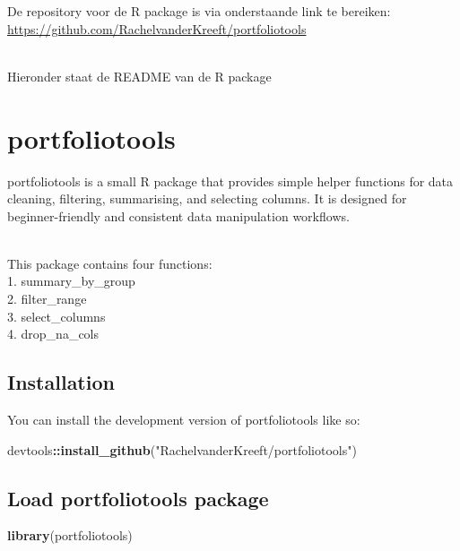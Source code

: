 \documentclass[
]{book}
\newenvironment{Shaded}{\begin{snugshade}}{\end{snugshade}}
\newcommand{\FunctionTok}[1]{\textcolor[rgb]{0.13,0.29,0.53}{\textbf{#1}}}
\newcommand{\NormalTok}[1]{#1}
\newcommand{\SpecialCharTok}[1]{\textcolor[rgb]{0.81,0.36,0.00}{\textbf{#1}}}
\newcommand{\StringTok}[1]{\textcolor[rgb]{0.31,0.60,0.02}{#1}}
\begin{document}
De repository voor de R package is via onderstaande link te bereiken:\\
\url{https://github.com/RachelvanderKreeft/portfoliotools}\strut \\
Hieronder staat de README van de R package\\

\section{portfoliotools}\label{portfoliotools}

portfoliotools is a small R package that provides simple helper functions
for data cleaning, filtering, summarising, and selecting columns.
It is designed for beginner-friendly and consistent data manipulation workflows.\\
\strut \\
This package contains four functions:\\
1. summary\_by\_group\\
2. filter\_range\\
3. select\_columns\\
4. drop\_na\_cols\\

\subsection{Installation}\label{installation}

You can install the development version of portfoliotools like so:

\begin{Shaded}
\begin{Highlighting}[]

\NormalTok{devtools}\SpecialCharTok{::}\FunctionTok{install\_github}\NormalTok{(}\StringTok{"RachelvanderKreeft/portfoliotools"}\NormalTok{)}
\end{Highlighting}
\end{Shaded}

\subsection{Load portfoliotools package}\label{load-portfoliotools-package}

\begin{Shaded}
\begin{Highlighting}[]
\FunctionTok{library}\NormalTok{(portfoliotools)}
\end{Highlighting}
\end{Shaded}
\end{document}
